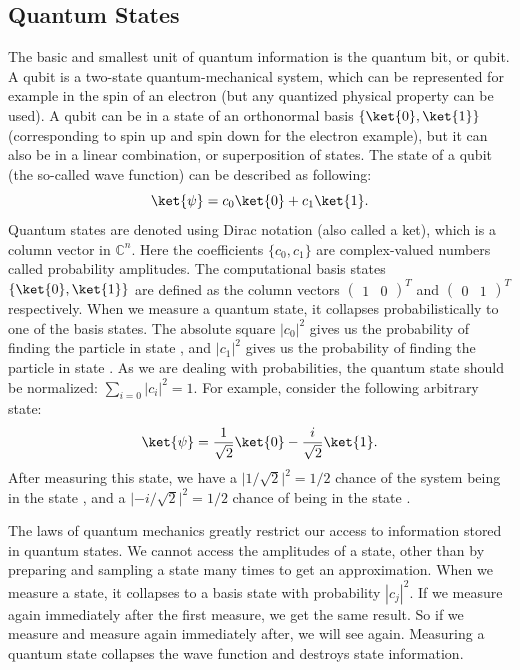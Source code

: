 \documentclass[a4paper,10pt]{article}
\begin{document}
\subsection{Quantum States}
The basic and smallest unit of quantum information is the quantum bit, or qubit.
A qubit is a two-state quantum-mechanical system, which can be represented for example in the spin of an electron (but any quantized physical property can be used).
A qubit can be in a state of an orthonormal basis $\{\ket{0}, \ket{1}\}$ (corresponding to spin up and spin down for the electron example), but it can also be in a linear combination, or superposition of states.
The state of a qubit (the so-called wave function) can be described as following:
\begin{equation}
\ket{\psi} = c_0\ket{0} + c_1\ket{1}.
\end{equation}
Quantum states are denoted using Dirac notation \ket{\,\cdotp\,} (also called a ket), which is a column vector in $\mathbb{C}^n$.
Here the coefficients $\{c_0, c_1\}$ are complex-valued numbers called probability amplitudes.
The computational basis states $\{\ket{0}, \ket{1}\}$ are defined as the column vectors $(\begin{matrix}1 & 0\end{matrix})^T$ and $(\begin{matrix}0 & 1\end{matrix})^T$ respectively.
When we measure a quantum state, it collapses probabilistically to one of the basis states.
The absolute square $|c_0|^2$ gives us the probability of finding the particle in state , and $|c_1|^2$ gives us the probability of finding the particle in state .
As we are dealing with probabilities, the quantum state should be normalized: $\sum_{i=0}|c_i|^2 = 1$.
For example, consider the following arbitrary state:
\begin{equation} \label{eq:arbitary_state_example}
\ket{\psi} = \dfrac{1}{\sqrt2}\ket{0} - \dfrac{i}{\sqrt2}\ket{1}.
\end{equation}
After measuring this state, we have a $\lvert1/\sqrt2\rvert^2 = 1/2$ chance of the system being in the state , and a $\lvert{-}i/\sqrt2\rvert^2 = 1/2$ chance of being in the state .

The laws of quantum mechanics greatly restrict our access to information stored in quantum states.
We cannot access the amplitudes of a state, other than by preparing and sampling a state many times to get an approximation. 
When we measure a state, it collapses to a basis state  with probability $|c_j|^2$.
If we measure again immediately after the first measure, we get the same result.
So if we measure  and measure again immediately after, we will see  again.
Measuring a quantum state collapses the wave function and destroys state information.
\end{document}

